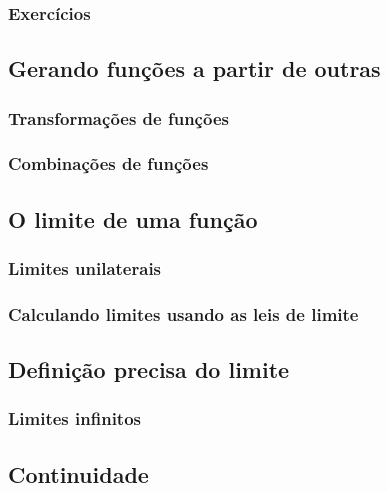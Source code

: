 \subsubsection{Exercícios}


\subsection{Gerando funções a partir de outras}
\subsubsection{Transformações de funções}
\subsubsection{Combinações de funções}

\subsection{O limite de uma função}

\subsubsection{Limites unilaterais}

\subsubsection{Calculando limites usando as leis de limite}

\subsection{Definição precisa do limite}
\subsubsection{Limites infinitos}
\subsection{Continuidade}


